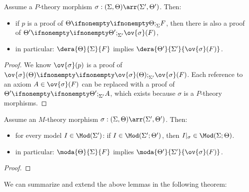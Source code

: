 \begin{lemma}\label{lem:fol:ptheomorph}
Assume a $P$-theory morphism $\sigma:(\Sigma,\Theta)\arr(\Sigma',\Theta')$. Then:
\begin{itemize}
 \item if $p$ is a proof of $\iscons{\Sigma}{\Theta}{}{F}$, then there is also a proof of $\iscons{\Sigma'}{\Theta'}{}{\ov{\sigma}(F)}$,
 \item in particular: $\dera{\Theta}{\Sigma}{F}$ implies $\dera{\Theta'}{\Sigma'}{\ov{\sigma}(F)}$.
\end{itemize}
\end{lemma}
\begin{proof}
We know $\ov{\sigma}(p)$ is a proof of $\iscons{\Sigma'}{\ov{\sigma}(\Theta)}{}{\ov{\sigma}(F)}$. Each reference to an axiom $A\in\ov{\sigma}(F)$ can be replaced with a proof of $\iscons{\Sigma'}{\Theta'}{}{A}$, which exists because $\sigma$ is a $P$-theory morphisms.
\end{proof}

\begin{lemma}\label{lem:fol:mtheomorph}
Assume an $M$-theory morphism $\sigma:(\Sigma,\Theta)\arr(\Sigma',\Theta')$. Then:
\begin{itemize}
 \item for every model $I\in\Mod(\Sigma')$: if $I\in\Mod(\Sigma';\Theta')$, then $\reduce{\sigma}{I}\in\Mod(\Sigma;\Theta)$.
 \item in particular: $\moda{\Theta}{\Sigma}{F}$ implies $\moda{\Theta'}{\Sigma'}{\ov{\sigma}(F)}$.
\end{itemize}
\end{lemma}
\begin{proof}
\end{proof}

We can summarize and extend the above lemmas in the following theorem:

